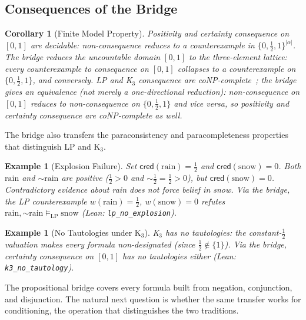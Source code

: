 \documentclass[11pt,a4paper]{article}
\newtheorem{corollary}[theorem]{Corollary}
\newtheorem{example}[theorem]{Example}
\newcommand{\cred}{\mathsf{cred}}
\newcommand{\negc}{\mathord{\sim}}
\begin{document}
\subsection{Consequences of the Bridge}
\label{sec:bridge-consequences}

\begin{corollary}[Finite Model Property]
\label{cor:finite-model}
Positivity and certainty consequence on $[0,1]$ are decidable:
non-consequence reduces to a counterexample in
$\{0, \tfrac{1}{2}, 1\}^{|\alpha|}$.
The bridge reduces the uncountable domain $[0,1]$ to the
three-element lattice: every counterexample to consequence on
$[0,1]$ collapses to a counterexample on
$\{0, \tfrac{1}{2}, 1\}$, and conversely.
LP and K$_3$ consequence are
coNP-complete~\cite{priest2008,avron1991}; the bridge gives
an equivalence (not merely a one-directional reduction):
non-consequence on $[0,1]$ reduces to non-consequence on
$\{0, \tfrac{1}{2}, 1\}$ and vice versa, so positivity and
certainty consequence are coNP-complete as well.
\end{corollary}

The bridge also transfers the paraconsistency and paracompleteness
properties that distinguish LP and K$_3$.

\begin{example}[Explosion Failure]
\label{ex:explosion}
Set $\cred(\text{rain}) = \tfrac{1}{2}$ and
$\cred(\text{snow}) = 0$.
Both $\text{rain}$ and $\negc\text{rain}$ are positive
($\tfrac{1}{2} > 0$ and $\negc\tfrac{1}{2} = \tfrac{1}{2} > 0$),
but $\cred(\text{snow}) = 0$. Contradictory evidence about rain
does not force belief in snow.
Via the bridge, the LP counterexample
$w(\text{rain}) = \tfrac{1}{2}$, $w(\text{snow}) = 0$ refutes
$\text{rain}, \negc\text{rain} \models_{\mathrm{LP}} \text{snow}$
(Lean: \texttt{lp\_no\_explosion}).
\end{example}

\begin{example}[No Tautologies under K$_3$]
\label{ex:no-tautologies}
K$_3$ has no tautologies: the constant-$\tfrac{1}{2}$ valuation
makes every formula non-designated (since $\tfrac{1}{2} \notin
\{1\}$).
Via the bridge, certainty consequence on $[0,1]$ has no tautologies
either
(Lean: \texttt{k3\_no\_tautology}).
\end{example}

The propositional bridge covers every formula built from negation,
conjunction, and disjunction.
The natural next question is whether the same transfer works for
conditioning, the operation that distinguishes the two traditions.
\end{document}

